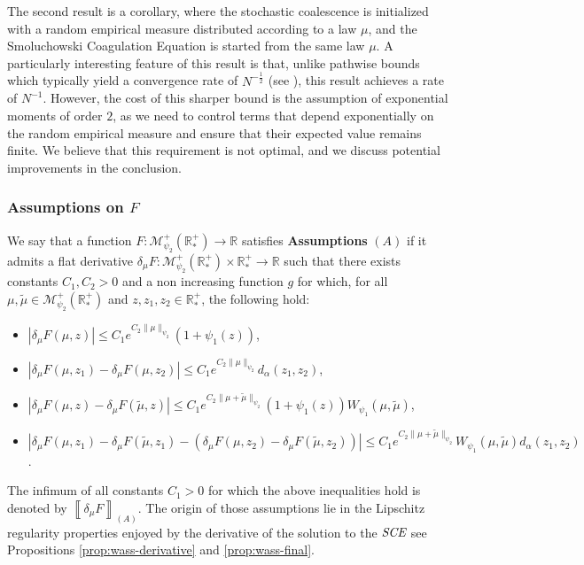 \documentclass[11pt,a4paper]{article}
\newcommand{\RR}{\mathbb{R}}
\newcommand{\RRP}{\mathbb{R}^+_*}
\newcommand{\MC}{\mathcal{M}}
\newcommand{\SCE}{\emph{SCE}}
\newcommand{\A}{(A)}
\begin{document}
The second result is a corollary, where the stochastic coalescence is initialized with a random empirical measure distributed according to a law $\mu$, and the Smoluchowski Coagulation Equation is started from the same law $\mu$. A particularly interesting feature of this result is that, unlike pathwise bounds which typically yield a convergence rate of $N^{-\frac{1}{2}}$ (see \cite{cepedaSmoluchowskisEquationRate2011a}), this result achieves a rate of $N^{-1}$. However, the cost of this sharper bound is the assumption of exponential moments of order $2$, as we need to control terms that depend exponentially on the random empirical measure and ensure that their expected value remains finite. We believe that this requirement is not optimal, and we discuss potential improvements in the conclusion.
\subsubsection*{Assumptions on $F$}

We say that a function \(F : \MC^+_{\psi_2}(\RRP) \to \RR\) satisfies \textbf{Assumptions} \(\A\) if it admits a flat derivative \(\delta_\mu F : \MC^+_{\psi_2}(\RRP) \times \RRP \to \RR\) such that there exists constants \(C_1,C_2 > 0\) and a non increasing function $g$ for which, for all \(\mu, \tilde{\mu} \in \MC^+_{\psi_2}(\RRP)\) and \(z, z_1, z_2 \in \RRP\), the following hold:
\begin{itemize}
    \item \(|\delta_\mu F(\mu, z)| \leq C_1 e^{C_2\|\mu\|_{\psi_2}} (1 + \psi_1(z))\),
    \item \(|\delta_\mu F(\mu, z_1) - \delta_\mu F(\mu, z_2)| \leq C_1 e^{C_2\|\mu\|_{\psi_2}} d_\alpha(z_1, z_2)\),
    \item \(|\delta_\mu F(\mu, z) - \delta_\mu F(\tilde{\mu}, z)| \leq C_1 e^{C_2\|\mu + \tilde{\mu}\|_{\psi_2}}(1 + \psi_1(z)) W_{\psi_1}(\mu, \tilde{\mu})\),
    \item \(|\delta_\mu F(\mu, z_1) - \delta_\mu F(\tilde{\mu}, z_1) - (\delta_\mu F(\mu, z_2) - \delta_\mu F(\tilde{\mu}, z_2))| \leq C_1 e^{C_2\|\mu + \tilde{\mu}\|_{\psi_2}} W_{\psi_1}(\mu, \tilde{\mu}) d_\alpha(z_1, z_2)\).
\end{itemize}

The infimum of all constants \(C_1 > 0\) for which the above inequalities hold is denoted by \(\left\llbracket \delta_\mu F \right\rrbracket_{\A}\). The origin of those assumptions lie in the Lipschitz regularity properties enjoyed by the derivative of the solution to the $\SCE$ see Propositions \ref{prop:wass-derivative} and \ref{prop:wass-final}.
\end{document}
